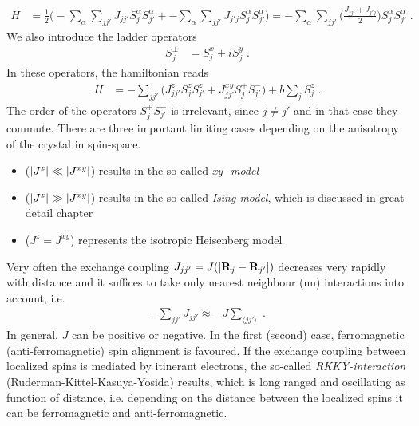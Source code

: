 %
\begin{align*}
H &= \frac{1}{2}\bigg(  -\sum_{\alpha}\sum_{jj'} J_{jj'} S^{\alpha}_{j}S^{\alpha}_{j'} 
+ -\sum_{\alpha}\sum_{jj'} J_{j'j} S^{\alpha}_{j}S^{\alpha}_{j'}  \bigg)=
 -\sum_{\alpha}\sum_{jj'} \big(\frac{J_{jj'}+J_{j'j}}{2}\big) S^{\alpha}_{j}S^{\alpha}_{j'} \;.
\end{align*}
%
We also introduce the ladder operators
%
\begin{align}\label{eq:}
S_{j}^{\pm} &= S_{j}^{x}\pm i S_{j}^{y}\;.
\end{align}
%
In these operators, the hamiltonian reads
\begin{align*}
H &= - \sum_{jj'} \bigg( J^{z}_{jj'} S_{j}^{z}  S_{j'}^{z}
+J_{jj'}^{xy}S_{j}^{+} S_{j'}^{-}
\bigg) + b \sum_{j} S^{z}_{j}\;.
\end{align*}
%
The order of the operators $S_{j}^{+}S_{j'}^{-}$ is irrelevant, since $j\ne j'$ and in that case they commute.
There are three important limiting cases depending on the anisotropy of the crystal in spin-space.
\begin{itemize}
	\item ($\abs{J^{z}}\ll\abs{J^{xy}}$) results in the so-called {\em xy- model}

\item ($\abs{J^{z}}\gg\abs{J^{xy}}$) results in the so-called {\em Ising model}, which is discussed in great detail chapter 
\item ($J^{z} = J^{xy}$)  represents the isotropic Heisenberg model

%
\end{itemize}
%
Very often the exchange coupling $J_{jj'} = J(\abs{\mathbf R_{j}-\mathbf R_{j'}})$ decreases
very rapidly with distance and it suffices to take only nearest neighbour (nn) interactions into account, i.e.
%
\begin{align}\label{eq:}
-\sum_{jj'} J_{jj'} \approx -J \sum_{\langle jj' \rangle}\;.
\end{align}
%
In general, $J$ can be positive or negative. In the first (second) case,  ferromagnetic (anti-ferromagnetic) spin alignment is favoured. If the exchange coupling between localized spins
is mediated by itinerant electrons, the so-called {\em RKKY-interaction} (Ruderman-Kittel-Kasuya-Yosida) results, which is long ranged and oscillating as function of distance, i.e.
depending on the distance between the localized spins it can be ferromagnetic and anti-ferromagnetic.
